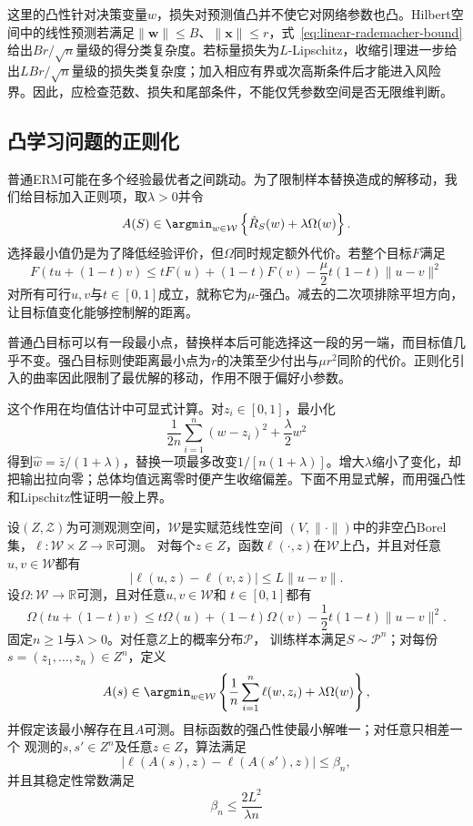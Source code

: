 这里的凸性针对决策变量$w$，损失对预测值凸并不使它对网络参数也凸。Hilbert空间中的线性预测若满足$\|\bm w\|\leq B$、$\|\bm x\|\leq r$，式~\eqref{eq:linear-rademacher-bound}给出$Br/\sqrt n$量级的得分类复杂度。若标量损失为$L$-Lipschitz，收缩引理进一步给出$LBr/\sqrt n$量级的损失类复杂度；加入相应有界或次高斯条件后才能进入风险界。因此，应检查范数、损失和尾部条件，不能仅凭参数空间是否无限维判断。

\subsection{凸学习问题的正则化}

普通ERM可能在多个经验最优者之间跳动。为了限制样本替换造成的解移动，我们给目标加入正则项，取$\lambda>0$并令
\begin{equation}
 A(S)\in\argmin_{w\in\mathcal W}
 \left\{\hat R_S(w)+\lambda\Omega(w)\right\}.
 \label{eq:regularized-erm}
\end{equation}
选择最小值仍是为了降低经验评价，但$\Omega$同时规定额外代价。若整个目标$F$满足
\begin{equation}
 F(tu+(1-t)v)\leq tF(u)+(1-t)F(v)
 -\frac\mu2t(1-t)\|u-v\|^2
 \label{eq:strong-convexity}
\end{equation}
对所有可行$u,v$与$t\in[0,1]$成立，就称它为$\mu$-强凸。减去的二次项排除平坦方向，让目标值变化能够控制解的距离。

普通凸目标可以有一段最小点，替换样本后可能选择这一段的另一端，而目标值几乎不变。强凸目标则使距离最小点为$r$的决策至少付出与$\mu r^2$同阶的代价。正则化引入的曲率因此限制了最优解的移动，作用不限于偏好小参数。

这个作用在均值估计中可显式计算。对$z_i\in[0,1]$，最小化
\[
 \frac1{2n}\sum_{i=1}^n(w-z_i)^2+\frac\lambda2w^2
\]
得到$\hat w=\bar z/(1+\lambda)$，替换一项最多改变$1/[n(1+\lambda)]$。增大$\lambda$缩小了变化，却把输出拉向零；总体均值远离零时便产生收缩偏差。下面不用显式解，而用强凸性和Lipschitz性证明一般上界。

\begin{theorem}[强凸正则化的稳定性]
\label{thm:regularized-erm-stability}
设$(Z,\mathcal Z)$为可测观测空间，$\mathcal W$是实赋范线性空间
$(V,\|\cdot\|)$中的非空凸Borel集，$\ell:\mathcal W\times Z\to\mathbb R$可测。
对每个$z\in Z$，函数$\ell(\cdot,z)$在$\mathcal W$上凸，并且对任意
$u,v\in\mathcal W$都有
\[
 |\ell(u,z)-\ell(v,z)|\leq L\|u-v\|.
\]
设$\Omega:\mathcal W\to\mathbb R$可测，且对任意$u,v\in\mathcal W$和
$t\in[0,1]$都有
\[
 \Omega(tu+(1-t)v)
 \leq t\Omega(u)+(1-t)\Omega(v)-\frac12t(1-t)\|u-v\|^2.
\]
固定$n\geq1$与$\lambda>0$。对任意$Z$上的概率分布$\mathcal P$，
训练样本满足$S\sim\mathcal P^n$；对每份$s=(z_1,\ldots,z_n)\in Z^n$，定义
\[
 A(s)\in\argmin_{w\in\mathcal W}
 \left\{\frac1n\sum_{i=1}^n\ell(w,z_i)+\lambda\Omega(w)\right\},
\]
并假定该最小解存在且$A$可测。目标函数的强凸性使最小解唯一；对任意只相差一个
观测的$s,s'\in Z^n$及任意$z\in Z$，算法满足
\[
 |\ell(A(s),z)-\ell(A(s'),z)|\leq\beta_n,
\]
并且其稳定性常数满足
\begin{equation}
 \beta_n\leq\frac{2L^2}{\lambda n}
 \label{eq:regularized-stability-bound}
\end{equation}
\end{theorem}


